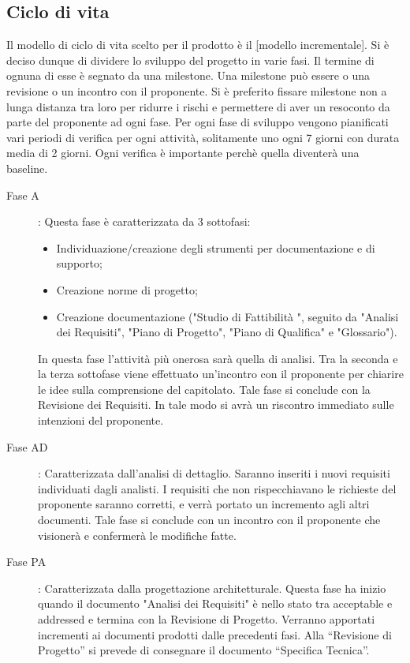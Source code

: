 	\subsection{Ciclo di vita}
		Il modello di ciclo di vita scelto per il prodotto è il \underline[modello incrementale].
		Si è deciso dunque di dividere lo sviluppo del progetto in varie fasi. Il termine di ognuna di esse è segnato da una milestone. Una milestone può essere o una revisione o un incontro con il proponente. Si è preferito fissare milestone non a lunga distanza tra loro per ridurre i rischi e permettere di aver un resoconto da parte del proponente ad ogni fase. Per ogni fase di sviluppo vengono pianificati vari periodi di verifica per ogni attività, solitamente uno ogni 7 giorni con durata media di 2 giorni. Ogni verifica è importante perchè quella diventerà una baseline.
		\begin{description}
			\item[Fase A]: Questa fase è caratterizzata da 3 sottofasi:
				\begin{itemize}
					\item Individuazione/creazione degli strumenti per documentazione e di supporto;
					\item Creazione norme di progetto;
					\item Creazione documentazione ("Studio di Fattibilità ", seguito da "Analisi dei Requisiti", "Piano di Progetto", "Piano di Qualifica" e "Glossario").
				\end{itemize}
				In questa fase l'attività più onerosa sarà quella di analisi.
				Tra la seconda e la terza sottofase viene effettuato un'incontro con il proponente per chiarire le idee sulla comprensione del capitolato.
				Tale fase si conclude con la Revisione dei Requisiti. In tale modo si avrà un riscontro immediato sulle intenzioni del proponente.
			\item[Fase AD]: Caratterizzata dall’analisi di dettaglio. Saranno inseriti i nuovi requisiti individuati dagli analisti. I requisiti che non rispecchiavano le richieste del proponente saranno corretti, e verrà portato un incremento agli altri documenti.
			Tale fase si conclude con un incontro con il proponente che visionerà e confermerà le modifiche fatte.
			\item[Fase PA]: Caratterizzata dalla progettazione architetturale. Questa fase ha inizio quando il documento "Analisi dei Requisiti" è nello stato tra acceptable e addressed e termina con la Revisione di Progetto. Verranno apportati incrementi ai documenti prodotti dalle precedenti fasi. Alla “Revisione di Progetto” si prevede di consegnare il documento “Specifica Tecnica”.

\end{description}
